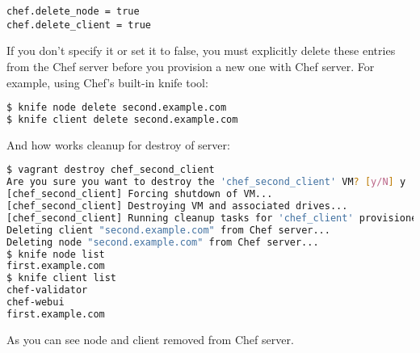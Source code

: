 \begin{lstlisting}[label=lst:my-server-cloud-node8]
chef.delete_node = true
chef.delete_client = true
\end{lstlisting}

If you don't specify it or set it to false, you must explicitly delete these entries from the Chef server before you provision a new one with Chef server. For example, using Chef's built-in knife tool:

\begin{lstlisting}[language=Bash,label=lst:my-server-cloud-node9]
$ knife node delete second.example.com
$ knife client delete second.example.com
\end{lstlisting}

And how works cleanup for destroy of server:

\begin{lstlisting}[language=Bash,label=lst:my-server-cloud-node11]
$ vagrant destroy chef_second_client
Are you sure you want to destroy the 'chef_second_client' VM? [y/N] y
[chef_second_client] Forcing shutdown of VM...
[chef_second_client] Destroying VM and associated drives...
[chef_second_client] Running cleanup tasks for 'chef_client' provisioner...
Deleting client "second.example.com" from Chef server...
Deleting node "second.example.com" from Chef server...
$ knife node list
first.example.com
$ knife client list
chef-validator
chef-webui
first.example.com
\end{lstlisting}

As you can see node and client removed from Chef server.
